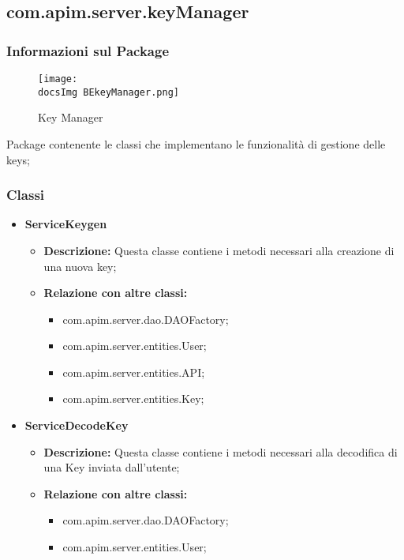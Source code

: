 {{    \subsection{com.apim.server.keyManager}{
    \subsubsection{Informazioni sul Package}
        \begin{figure}[H]
          \centering
          \texttt{[image: \\docsImg BEkeyManager.png]}
          \caption{Key Manager}
          \label{Key Manager}
        \end{figure}
        Package contenente le classi che implementano le funzionalità di gestione delle keys;
        \subsubsection{Classi}
        \begin{itemize} \itemsep1pt
          \item \textbf{ServiceKeygen}
          \begin{itemize}
            \item \textbf{Descrizione:} Questa classe contiene i metodi necessari alla creazione di una nuova key;
            \item \textbf{Relazione con altre classi:}
            \begin{itemize}
            \item com.apim.server.dao.DAOFactory;
            \item com.apim.server.entities.User;
            \item com.apim.server.entities.API;
            \item com.apim.server.entities.Key;
            \end{itemize}
          \end{itemize}
          \item \textbf{ServiceDecodeKey}
          \begin{itemize}
            \item \textbf{Descrizione:} Questa classe contiene i metodi necessari alla decodifica di una Key inviata dall'utente;
            \item \textbf{Relazione con altre classi:}
            \begin{itemize}
            \item com.apim.server.dao.DAOFactory;
            \item com.apim.server.entities.User;

\end{itemize}
\end{itemize}
\end{itemize}}}}
